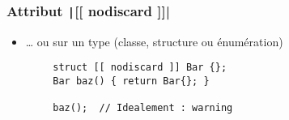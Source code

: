 \documentclass[C++.tex]{subfiles}
\begin{document}
\begin{frame}[fragile]
	\frametitle{Attribut \texttt|[[ nodiscard ]]|}
	\begin{itemize}
		\item \ldots{} ou sur un type (classe, structure ou énumération)
	\end{itemize}

	\begin{verbatim}
		struct [[ nodiscard ]] Bar {};
		Bar baz() { return Bar{}; }

		baz();  // Idealement : warning
	\end{verbatim}


\end{frame}
\end{document}
